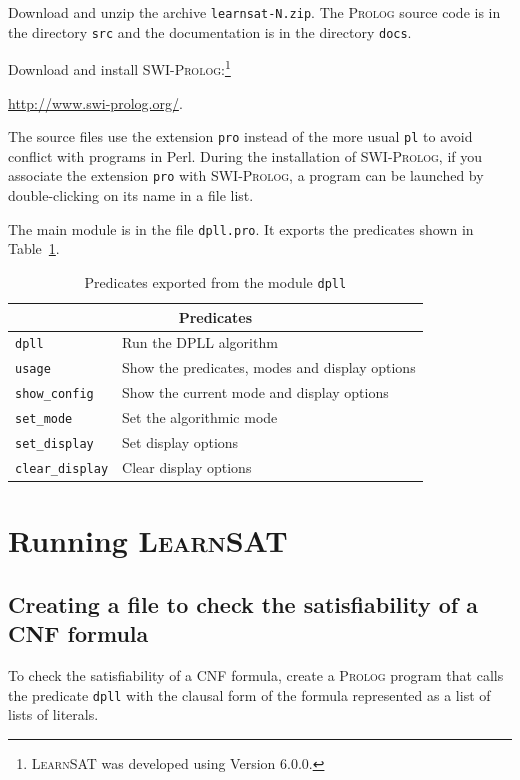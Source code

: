\documentclass[11pt]{report}
\newcommand*{\p}[1]{\textup{\texttt{#1}}}
\newcommand*{\ls}{\textsc{LearnSAT}}
\newcommand*{\pl}{\textsc{Prolog}}
\newcommand*{\sw}{\textsc{SWI-Prolog}}
\begin{document}
Download and unzip the archive \p{learnsat-N.zip}. The \pl{} source code
is in the directory \p{src} and the documentation is in the directory
\p{docs}.

Download and install \sw{}:\footnote{\ls{} was developed using
Version 6.0.0.}
\begin{center}
\url{http://www.swi-prolog.org/}.
\end{center}

The source files use the extension \p{pro} instead of the more usual
\p{pl} to avoid conflict with programs in Perl. During the installation
of \sw{}, if you associate the extension \p{pro} with \sw{}, a
program can be launched by double-clicking on its name in a file list. 

The main module is in the file \p{dpll.pro}. It exports the predicates
shown in Table~\ref{tab.export}.

\begin{table}
\begin{center}
\begin{tabular}{|l|l|}
\hline
\multicolumn{2}{|c|}{\textbf{\large Predicates}}\\
\hline
\p{dpll}&Run the DPLL algorithm\\
\p{usage}&Show the predicates, modes and display options \\
\p{show\_config}&Show the current mode and display options\\
\p{set\_mode}&Set the algorithmic mode\\
\p{set\_display}&Set display options\\
\p{clear\_display}&Clear display options\\
\hline
\end{tabular}
\end{center}
\caption{Predicates exported from the module \p{dpll}}\label{tab.export}
\end{table}


\section{Running \ls}

\subsection{Creating a file to check the satisfiability of a CNF formula}

To check the satisfiability of a CNF formula, create a \pl{} program
that calls the predicate \p{dpll} with the clausal form of the formula
represented as a list of lists of literals.
\end{document}
